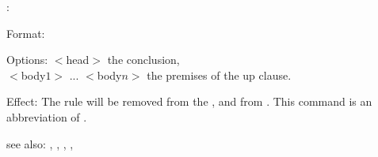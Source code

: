 \rxup:

Format: 

Options: $<$head$>$ the conclusion,\\
         $<$body$1>$ ... $<$body$n>$ the premises of the up clause.

Effect: The rule  will be removed from the 
	, and  from .
        This command is an abbreviation of .

see also: \rx, \rxrl, \consult, \destroy, \replace
